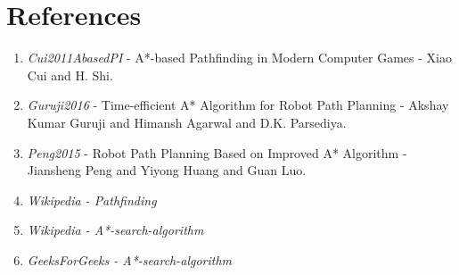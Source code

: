 \documentclass{article}
\theoremstyle{definition}
\begin{document}
\section{References}
\begin{enumerate}
    \item \textit{Cui2011AbasedPI} - A*-based Pathfinding in Modern Computer Games - Xiao Cui and H. Shi.
    \item \textit{Guruji2016} - Time-efficient A* Algorithm for Robot Path Planning - Akshay Kumar Guruji and Himansh Agarwal and D.K. Parsediya.
    \item \textit{Peng2015} - Robot Path Planning Based on Improved A* Algorithm - Jiansheng Peng and Yiyong Huang and Guan Luo.
    \item \textit{Wikipedia - Pathfinding} 
    \item \textit{Wikipedia - A*-search-algorithm}
    \item \textit{GeeksForGeeks - A*-search-algorithm}
\end{enumerate}

\end{document}
